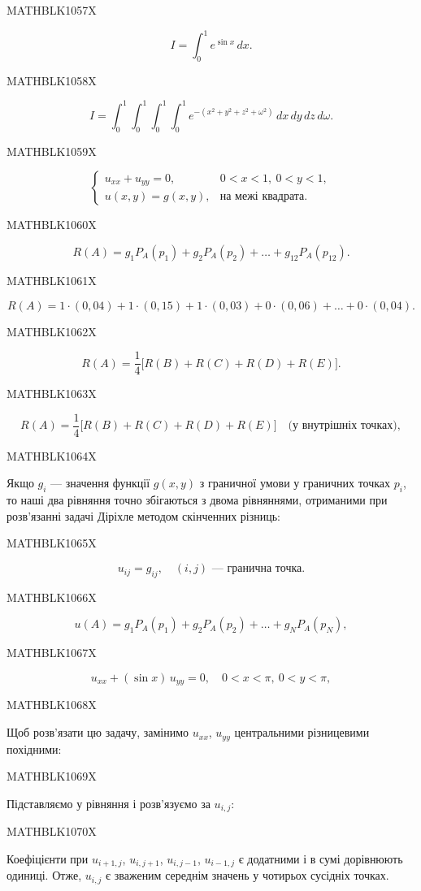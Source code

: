 \documentclass[
  ukrainian,
]{article}
\begin{document}
MATHBLK1057X

\[
I = \int_{0}^{1} e^{\sin x}\, dx.
\]

MATHBLK1058X

\[
I = \int_{0}^{1}\int_{0}^{1}\int_{0}^{1}\int_{0}^{1} e^{-(x^{2}+y^{2}+z^{2}+\omega^{2})}\, dx\, dy\, dz\, d\omega.
\]

MATHBLK1059X

\[
\begin{cases}u_{xx} + u_{yy} = 0, & 0 < x < 1,\ 0 < y < 1, \\u(x,y) = g(x,y), & \text{на межі квадрата.}\end{cases}
\]

MATHBLK1060X

\[
R(A) = g_1 P_A(p_1) + g_2 P_A(p_2) + \dots + g_{12} P_A(p_{12}).
\]

MATHBLK1061X

\[
R(A) = 1\cdot(0{,}04) + 1\cdot(0{,}15) + 1\cdot(0{,}03) + 0\cdot(0{,}06) + \dots + 0\cdot(0{,}04).
\]

MATHBLK1062X

\[
R(A) = \frac{1}{4}\bigl[R(B) + R(C) + R(D) + R(E)\bigr].
\]

MATHBLK1063X

\[
R(A) = \frac{1}{4}\bigl[R(B) + R(C) + R(D) + R(E)\bigr] \quad \text{(у внутрішніх точках)},
\]

MATHBLK1064X

Якщо \(g_i\) --- значення функції \(g(x, y)\) з граничної умови у
граничних точках \(p_i\), то наші два рівняння точно збігаються з двома
рівняннями, отриманими при розв'язанні задачі Діріхле методом скінченних
різниць:

MATHBLK1065X

\[
u_{ij} = g_{ij}, \quad (i,j) \text{ — гранична точка}.
\]

MATHBLK1066X

\[
u(A) = g_1 P_A(p_1) + g_2 P_A(p_2) + \dots + g_N P_A(p_N),
\]

MATHBLK1067X

\[
u_{xx} + (\sin x)\, u_{yy} = 0, \quad 0 < x < \pi,\ 0 < y < \pi,
\]

MATHBLK1068X

Щоб розв'язати цю задачу, замінимо \(u_{xx}\), \(u_{yy}\) центральними
різницевими похідними:

MATHBLK1069X

Підставляємо у рівняння і розв'язуємо за \(u_{i, j}\):

MATHBLK1070X

Коефіцієнти при \(u_{i+1,j}\), \(u_{i,j+1}\), \(u_{i,j-1}\),
\(u_{i-1,j}\) є додатними і в сумі дорівнюють одиниці. Отже, \(u_{i,j}\)
є зваженим середнім значень у чотирьох сусідніх точках.
\end{document}
